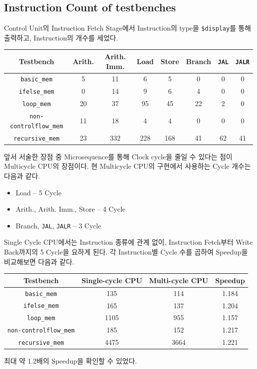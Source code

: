 \documentclass{scrartcl}
\begin{document}
\subsection{Instruction Count of testbenches}
Control Unit의 Instruction Fetch Stage에서 Instruction의 type을 \texttt{\$display}를 통해 출력하고,
Instruction의 개수를 세었다.
\begin{center}
  \begin{tabular}{ | c | c | c | c | c | c | c | c | }
    \hline
    \textbf{Testbench} & \textbf{Arith.} & \textbf{Arith. Imm.} & \textbf{Load} & \textbf{Store} & \textbf{Branch} & \textbf{\texttt{JAL}} & \textbf{\texttt{JALR}}\\ \hline
    \texttt{basic\_mem} & 5 & 11 & 6 & 5 & 0 & 0 & 0 \\ \hline
    \texttt{ifelse\_mem} & 0 & 14 & 9 & 6 & 4 & 0 & 0 \\ \hline
    \texttt{loop\_mem} & 20 & 37 & 95 & 45 & 22 & 2 & 0 \\ \hline
    \texttt{non-controlflow\_mem} & 11 & 18 & 4 & 4 & 0 & 0 & 0 \\ \hline
    \texttt{recursive\_mem} & 23 & 332 & 228 & 168 & 41 & 62 & 41 \\
    \hline
  \end{tabular}
\end{center}
앞서 서술한 장점 중 Microsequence를 통해 Clock cycle을 줄일 수 있다는 점이 Multicycle CPU의 장점이다.
현 Multicycle CPU의 구현에서 사용하는 Cycle 개수는 다음과 같다.
\begin{itemize}
  \item Load -- 5 Cycle
  \item Arith., Arith. Imm., Store -- 4 Cycle
  \item Branch, \texttt{JAL}, \texttt{JALR} -- 3 Cycle
\end{itemize}
Single Cycle CPU에서는 Instruction 종류에 관계 없이, Instruction Fetch부터 Write Back까지의 5 Cycle을 요하게 된다.
각 Instruction별 Cycle 수를 곱하여 Speedup을 비교해보면 다음과 같다.
\begin{center}
  \begin{tabular}{ | c | c | c | c |}
    \hline
    \textbf{Testbench} & \textbf{Single-cycle CPU} & \textbf{Multi-cycle CPU} & \textbf{Speedup}\\ \hline
    \texttt{basic\_mem} & 135 & 114 & 1.184 \\ \hline
    \texttt{ifelse\_mem} & 165 & 137 & 1.204 \\ \hline
    \texttt{loop\_mem} & 1105 & 955 & 1.157 \\ \hline
    \texttt{non-controlflow\_mem} & 185 & 152 & 1.217 \\ \hline
    \texttt{recursive\_mem} & 4475 & 3664 & 1.221 \\
    \hline
  \end{tabular}
\end{center}
최대 약 1.2배의 Speedup을 확인할 수 있었다.
\end{document}
